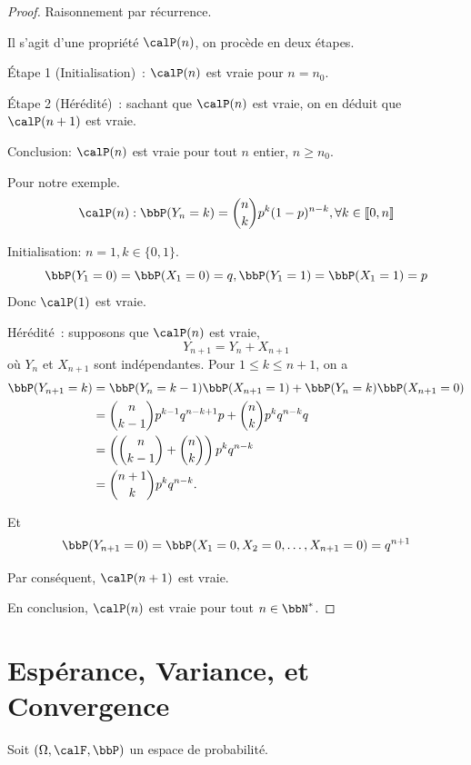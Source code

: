 \begin{proof}
    Raisonnement par récurrence.

    Il s'agit d'une propriété $\calP(n)$, on procède en deux étapes.

    Étape 1 (Initialisation)~: $\calP(n)$ est vraie pour $n = n_0$.

    Étape 2 (Hérédité)~: sachant que $\calP(n)$ est vraie, on en déduit que $\calP(n + 1)$ est vraie.

    Conclusion: $\calP(n)$ est vraie pour tout $n$ entier, $n \geqslant n_0$.

    Pour notre exemple.
    \[ \calP(n): \bbP(Y_n = k) = \binom{n}{k} p^k (1 - p)^{n - k}, \forall k \in \llb 0, n \rrb \]

    Initialisation: $n = 1, k \in \{ 0, 1 \}$.
    \[ \bbP(Y_1 = 0) = \bbP(X_1 = 0) = q, \bbP(Y_1 = 1) = \bbP(X_1 = 1) = p \]
    Donc $\calP(1)$ est vraie.

    Hérédité~: supposons que $\calP(n)$ est vraie,
    \[ Y_{n + 1} = Y_n + X_{n + 1} \]
    où $Y_n$ et $X_{n + 1}$ sont indépendantes.
    Pour $1 \leqslant k \leqslant n + 1$, on a
    \begin{align*}
        \bbP(Y_{n + 1} = k) & = \bbP(Y_n = k - 1) \bbP(X_{n + 1} = 1) + \bbP(Y_n = k) \bbP(X_{n + 1} = 0) \\
                            & = \binom{n}{k - 1} p^{k - 1} q^{n - k + 1} p + \binom{n}{k} p^k q^{n - k} q \\
                            & = \left(\binom{n}{k - 1} + \binom{n}{k}\right) p^k q^{n - k}                \\
                            & = \binom{n + 1}{k} p^k q^{n - k}.
    \end{align*}

    Et
    \[ \bbP(Y_{n + 1} = 0) = \bbP(X_1 = 0, X_2 = 0, \ldots, X_{n + 1} = 0) = q^{n + 1} \]

    Par conséquent, $\calP(n + 1)$ est vraie.

    En conclusion, $\calP(n)$ est vraie pour tout $n \in \bbN^*$.
\end{proof}

\section{Espérance, Variance, et Convergence}

Soit $(\Omega, \calF, \bbP)$ un espace de probabilité.

\subsection{}

